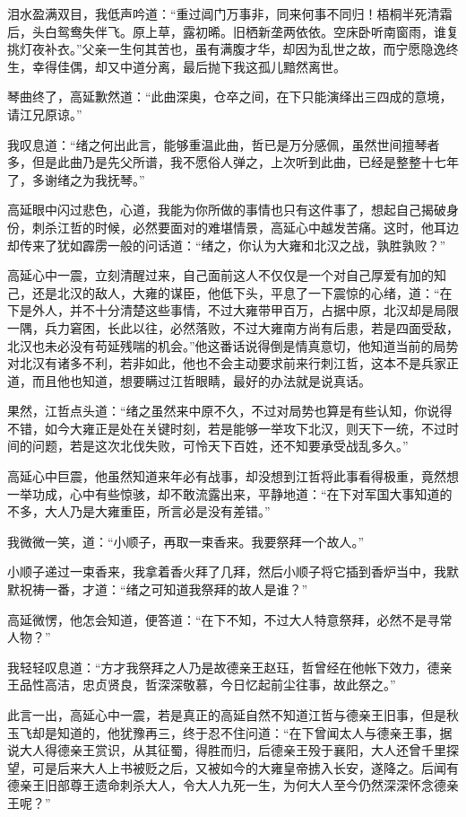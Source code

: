 泪水盈满双目，我低声吟道：“重过阊门万事非，同来何事不同归！梧桐半死清霜后，头白鸳鸯失伴飞。原上草，露初晞。旧栖新垄两依依。空床卧听南窗雨，谁复挑灯夜补衣。”父亲一生何其苦也，虽有满腹才华，却因为乱世之故，而宁愿隐逸终生，幸得佳偶，却又中道分离，最后抛下我这孤儿黯然离世。

琴曲终了，高延歉然道：“此曲深奥，仓卒之间，在下只能演绎出三四成的意境，请江兄原谅。”

我叹息道：“绪之何出此言，能够重温此曲，哲已是万分感佩，虽然世间擅琴者多，但是此曲乃是先父所谱，我不愿俗人弹之，上次听到此曲，已经是整整十七年了，多谢绪之为我抚琴。”

高延眼中闪过悲色，心道，我能为你所做的事情也只有这件事了，想起自己揭破身份，刺杀江哲的时候，必然要面对的难堪情景，高延心中越发苦痛。这时，他耳边却传来了犹如霹雳一般的问话道：“绪之，你认为大雍和北汉之战，孰胜孰败？”

高延心中一震，立刻清醒过来，自己面前这人不仅仅是一个对自己厚爱有加的知己，还是北汉的敌人，大雍的谋臣，他低下头，平息了一下震惊的心绪，道：“在下是外人，并不十分清楚这些事情，不过大雍带甲百万，占据中原，北汉却是局限一隅，兵力窘困，长此以往，必然落败，不过大雍南方尚有后患，若是四面受敌，北汉也未必没有苟延残喘的机会。”他这番话说得倒是情真意切，他知道当前的局势对北汉有诸多不利，若非如此，他也不会主动要求前来行刺江哲，这本不是兵家正道，而且他也知道，想要瞒过江哲眼睛，最好的办法就是说真话。

果然，江哲点头道：“绪之虽然来中原不久，不过对局势也算是有些认知，你说得不错，如今大雍正是处在关键时刻，若是能够一举攻下北汉，则天下一统，不过时间的问题，若是这次北伐失败，可怜天下百姓，还不知要承受战乱多久。”

高延心中巨震，他虽然知道来年必有战事，却没想到江哲将此事看得极重，竟然想一举功成，心中有些惊骇，却不敢流露出来，平静地道：“在下对军国大事知道的不多，大人乃是大雍重臣，所言必是没有差错。”

我微微一笑，道：“小顺子，再取一束香来。我要祭拜一个故人。”

小顺子递过一束香来，我拿着香火拜了几拜，然后小顺子将它插到香炉当中，我默默祝祷一番，才道：“绪之可知道我祭拜的故人是谁？”

高延微愣，他怎会知道，便答道：“在下不知，不过大人特意祭拜，必然不是寻常人物？”

我轻轻叹息道：“方才我祭拜之人乃是故德亲王赵珏，哲曾经在他帐下效力，德亲王品性高洁，忠贞贤良，哲深深敬慕，今日忆起前尘往事，故此祭之。”

此言一出，高延心中一震，若是真正的高延自然不知道江哲与德亲王旧事，但是秋玉飞却是知道的，他犹豫再三，终于忍不住问道：“在下曾闻太人与德亲王事，据说大人得德亲王赏识，从其征蜀，得胜而归，后德亲王殁于襄阳，大人还曾千里探望，可是后来大人上书被贬之后，又被如今的大雍皇帝掳入长安，遂降之。后闻有德亲王旧部尊王遗命刺杀大人，令大人九死一生，为何大人至今仍然深深怀念德亲王呢？”

